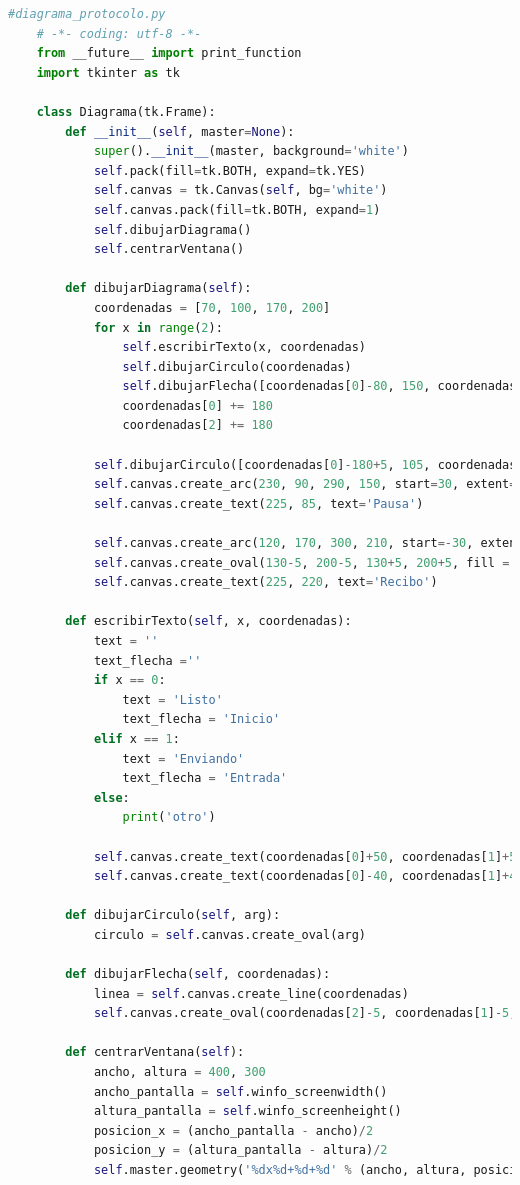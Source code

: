 	\begin{lstlisting}[language=Python]
	#diagrama_protocolo.py
	# -*- coding: utf-8 -*-
	from __future__ import print_function
	import tkinter as tk
	
	class Diagrama(tk.Frame):
		def __init__(self, master=None):
			super().__init__(master, background='white')
			self.pack(fill=tk.BOTH, expand=tk.YES)
			self.canvas = tk.Canvas(self, bg='white')
			self.canvas.pack(fill=tk.BOTH, expand=1)
			self.dibujarDiagrama()
			self.centrarVentana()
		
		def dibujarDiagrama(self):
			coordenadas = [70, 100, 170, 200]
			for x in range(2):
				self.escribirTexto(x, coordenadas)
				self.dibujarCirculo(coordenadas)
				self.dibujarFlecha([coordenadas[0]-80, 150, coordenadas[2]-100, 150])
				coordenadas[0] += 180
				coordenadas[2] += 180
		
			self.dibujarCirculo([coordenadas[0]-180+5, 105, coordenadas[2]-180-5, 195]) # circulo interior
			self.canvas.create_arc(230, 90, 290, 150, start=30, extent=235, style='arc')
			self.canvas.create_text(225, 85, text='Pausa')
			
			self.canvas.create_arc(120, 170, 300, 210, start=-30, extent=-120, style='arc')
			self.canvas.create_oval(130-5, 200-5, 130+5, 200+5, fill = 'black')
			self.canvas.create_text(225, 220, text='Recibo')
		
		def escribirTexto(self, x, coordenadas):
			text = ''
			text_flecha =''
			if x == 0:
				text = 'Listo'
				text_flecha = 'Inicio'
			elif x == 1:
				text = 'Enviando'
				text_flecha = 'Entrada'
			else:
				print('otro')
			
			self.canvas.create_text(coordenadas[0]+50, coordenadas[1]+50, font=('15'), text=text)
			self.canvas.create_text(coordenadas[0]-40, coordenadas[1]+40, text=text_flecha)
			
		def dibujarCirculo(self, arg):
			circulo = self.canvas.create_oval(arg)
		
		def dibujarFlecha(self, coordenadas):
			linea = self.canvas.create_line(coordenadas)
			self.canvas.create_oval(coordenadas[2]-5, coordenadas[1]-5, coordenadas[2]+5,coordenadas[1]+5, fill = 'black')
		
		def centrarVentana(self):
			ancho, altura = 400, 300
			ancho_pantalla = self.winfo_screenwidth()
			altura_pantalla = self.winfo_screenheight()
			posicion_x = (ancho_pantalla - ancho)/2
			posicion_y = (altura_pantalla - altura)/2
			self.master.geometry('%dx%d+%d+%d' % (ancho, altura, posicion_x, posicion_y))
	\end{lstlisting}
	
